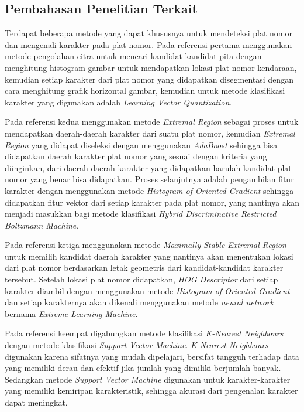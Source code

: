 \subsection{Pembahasan Penelitian Terkait}
\noindent Terdapat beberapa metode yang dapat khususnya untuk mendeteksi plat nomor dan mengenali karakter pada plat nomor.
\noindent Pada referensi pertama \cite{nugroho} menggunakan metode pengolahan citra untuk mencari kandidat-kandidat pita dengan menghitung histogram gambar untuk mendapatkan lokasi plat nomor kendaraan, kemudian setiap karakter dari plat nomor yang didapatkan disegmentasi dengan cara menghitung grafik horizontal gambar, kemudian untuk metode klasifikasi karakter yang digunakan adalah \textit{Learning Vector Quantization}.

\noindent Pada referensi kedua \cite{gou2016} menggunakan metode \textit{Extremal Region} sebagai proses untuk mendapatkan daerah-daerah karakter dari suatu plat nomor, kemudian \textit{Extremal Region} yang didapat diseleksi dengan menggunakan \textit{AdaBoost} sehingga bisa didapatkan daerah karakter plat nomor yang sesuai dengan kriteria yang diinginkan, dari daerah-daerah karakter yang didapatkan barulah kandidat plat nomor yang benar bisa didapatkan. Proses selanjutnya adalah pengambilan fitur karakter dengan menggunakan metode \textit{Histogram of Oriented Gradient} sehingga didapatkan fitur vektor dari setiap karakter pada plat nomor, yang nantinya akan menjadi masukkan bagi metode klasifikasi \textit{Hybrid Discriminative Restricted Boltzmann Machine}.

\noindent Pada referensi ketiga \cite{gou2014} menggunakan metode \textit{Maximally Stable Extremal Region} untuk memilih kandidat daerah karakter yang nantinya akan menentukan lokasi dari plat nomor berdasarkan letak geometris dari kandidat-kandidat karakter tersebut. Setelah lokasi plat nomor didapatkan, \textit{HOG Descriptor} dari setiap karakter diambil dengan menggunakan metode \textit{Histogram of Oriented Gradient} dan setiap karakternya akan dikenali menggunakan metode \textit{neural network} bernama \textit{Extreme Learning Machine}.

\noindent Pada referensi keempat \cite{tabrizi} digabungkan metode klasifikasi \textit{K-Nearest Neighbours} dengan metode klasifikasi \textit{Support Vector Machine}. \textit{K-Nearest Neighbours} digunakan karena sifatnya yang mudah dipelajari, bersifat tangguh terhadap data yang memiliki derau dan efektif jika jumlah yang dimiliki berjumlah banyak. Sedangkan metode \textit{Support Vector Machine} digunakan untuk karakter-karakter yang memiliki kemiripan karakteristik, sehingga akurasi dari pengenalan karakter dapat meningkat.

